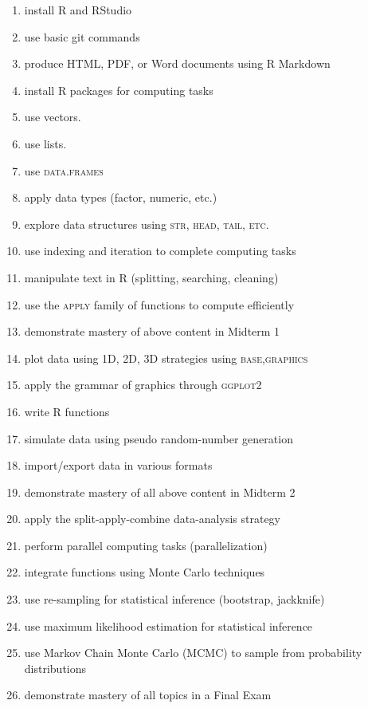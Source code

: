 \documentclass[11pt,onecolumn]{article}
\begin{document}
\begin{enumerate}
  \itemsep0em 
\item install R and RStudio
\item use basic git commands
\item produce HTML, PDF, or Word documents using R Markdown
\item install R packages for computing tasks
\item use vectors.
\item use lists.
\item use \textsc{data.frames}
\item apply data types (factor, numeric, etc.)
\item explore data structures using \textsc{str, head, tail, etc.}
\item use indexing and iteration to complete computing tasks
\item manipulate text in R (splitting, searching, cleaning)
\item use the \textsc{apply} family of functions to compute efficiently
\item demonstrate mastery of above content in Midterm 1
\item plot data using 1D, 2D, 3D strategies using \textsc{base,graphics}
\item apply the grammar of graphics through \textsc{ggplot2}
\item write R functions
\item simulate data using pseudo random-number generation
\item import/export data in various formats
\item demonstrate mastery of all above content in Midterm 2
\item apply the split-apply-combine data-analysis strategy
\item perform parallel computing tasks (parallelization)
\item integrate functions using Monte Carlo techniques
\item use re-sampling for statistical inference (bootstrap, jackknife)
\item use maximum likelihood estimation for statistical inference
\item use Markov Chain Monte Carlo (MCMC) to sample from probability distributions
\item demonstrate mastery of all topics in a Final Exam
\end{enumerate}
\end{document}
